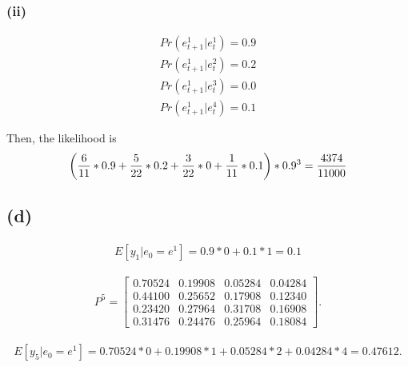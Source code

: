 \documentclass{ltjsarticle}
\begin{document}
\subsubsection*{(ii)}

\begin{align*}
    Pr(e^1_{t+1}|e^1_{t})=0.9\\
    Pr(e^1_{t+1}|e^2_{t})=0.2\\
    Pr(e^1_{t+1}|e^3_{t})=0.0\\
    Pr(e^1_{t+1}|e^4_{t})=0.1
\end{align*}


Then, the likelihood is 
\begin{align*}
    \qty(\frac{6}{11}*0.9+\frac{5}{22}*0.2+\frac{3}{22}*0+\frac{1}{11}*0.1)*0.9^3=\frac{4374}{11000}
\end{align*}



\subsection*{(d)}

\begin{align*}
    E[y_1|e_0=e^1] = 0.9*0 + 0.1*1 = 0.1
\end{align*}


\begin{align*}
    P^5 = \begin{bmatrix}
        0.70524 & 0.19908 & 0.05284 & 0.04284 \\
        0.44100 & 0.25652 & 0.17908 & 0.12340 \\
        0.23420 & 0.27964 & 0.31708 & 0.16908 \\
        0.31476 & 0.24476 & 0.25964 & 0.18084
        \end{bmatrix}.
\end{align*}

\begin{align*}
    E[y_5|e_0=e^1] = 0.70524*0 + 0.19908*1 + 0.05284*2 + 0.04284*4 = 0.47612.
\end{align*}
\end{document}
